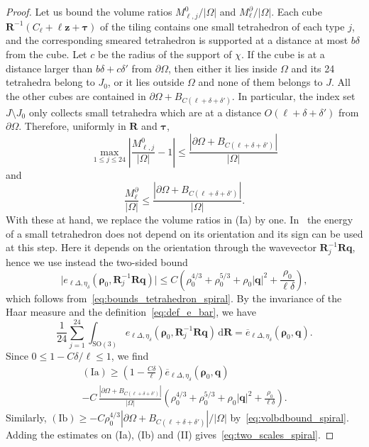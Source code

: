 \documentclass[final,reqno]{amsart}
\theoremstyle{remark}
\renewcommand{\le}{\leqslant}
\renewcommand{\ge}{\geqslant}
\newcommand{\ol}[1]{\overline{#1}}
\newcommand{\SO}{\mathrm{SO}}
\newcommand{\tetra}{\mathbb{\Delta}}
\newcommand{\dd}{\mathrm{d}}
\begin{document}
\begin{proof}
Let us bound the volume ratios $M^0_{\ell,j}/|\Omega|$ and $M^\partial_\ell/|\Omega|$. Each cube $\mathbf{R}^{-1}(C_\ell+\ell\mathbf{z}+\bm{\tau})$ of the tiling contains one small tetrahedron of each type $j$, and the corresponding smeared tetrahedron is supported at a distance at most $b\delta$ from the cube. Let $c$ be the radius of the support of $\chi$. If the cube is at a distance larger than $b\delta+c\delta'$ from $\partial\Omega$, then either it lies inside $\Omega$ and its 24 tetrahedra belong to $J_0$, or it lies outside $\Omega$ and none of them belongs to $J$. All the other cubes are contained in $\partial\Omega+B_{C(\ell+\delta+\delta')}$. In particular, the index set $J\setminus J_0$ only collects small tetrahedra which are at a distance $O(\ell+\delta+\delta')$ from $\partial\Omega$. Therefore, uniformly in $\mathbf{R}$ and $\bm{\tau}$,
\begin{equation*}
 \max_{1\le j\le24}\left|\frac{M^0_{\ell,j}}{|\Omega|}-1\right|
 \le\frac{|\partial\Omega+B_{C(\ell+\delta+\delta')}|}{|\Omega|}
\end{equation*}
and
\begin{equation}\label{eq:volbdbound_spiral}
 \frac{M^\partial_\ell}{|\Omega|}\le\frac{|\partial\Omega+B_{C(\ell+\delta+\delta')}|}{|\Omega|}.
\end{equation}
With these at hand, we replace the volume ratios in (Ia) by one. In~\cite{csirik2026non} the energy of a small tetrahedron does not depend on its orientation and its sign can be used at this step. Here it depends on the orientation through the wavevector $\mathbf{R}_j^{-1}\mathbf{R}\mathbf{q}$, hence we use instead the two-sided bound
\[
 \big|e_{\ell\tetra,\eta_\delta}(\bm{\rho}_0,\mathbf{R}_j^{-1}\mathbf{R}\mathbf{q})\big|\le C\left(\rho_0^{4/3}+\rho_0^{5/3}+\rho_0|\mathbf{q}|^2+\frac{\rho_0}{\ell\delta}\right),
\]
which follows from~\cref{eq:bounds_tetrahedron_spiral}. By the invariance of the Haar measure and the definition~\cref{eq:def_e_bar}, we have
\[
 \frac1{24}\sum_{j=1}^{24}\int_{\SO(3)}
 e_{\ell\tetra,\eta_\delta}(\bm{\rho}_0,\mathbf{R}_j^{-1}\mathbf{R}\mathbf{q})\,\dd\mathbf{R}
 =\ol e_{\ell\tetra,\eta_\delta}(\bm{\rho}_0,\mathbf{q}).
\]
Since $0\le1-C\delta/\ell\le1$, we find
\begin{multline*}
 \mathrm{(Ia)}\ge\left(1-\frac{C\delta}{\ell}\right)\ol e_{\ell\tetra,\eta_\delta}(\bm{\rho}_0,\mathbf{q})\\
 -C\,\frac{|\partial\Omega+B_{C(\ell+\delta+\delta')}|}{|\Omega|}\left(\rho_0^{4/3}+\rho_0^{5/3}+\rho_0|\mathbf{q}|^2+\frac{\rho_0}{\ell\delta}\right).
\end{multline*}
Similarly, $\mathrm{(Ib)}\ge-C\rho_0^{4/3}|\partial\Omega+B_{C(\ell+\delta+\delta')}|/|\Omega|$ by~\cref{eq:volbdbound_spiral}. Adding the estimates on (Ia), (Ib) and (II) gives~\cref{eq:two_scales_spiral}.


\end{proof}
\end{document}
